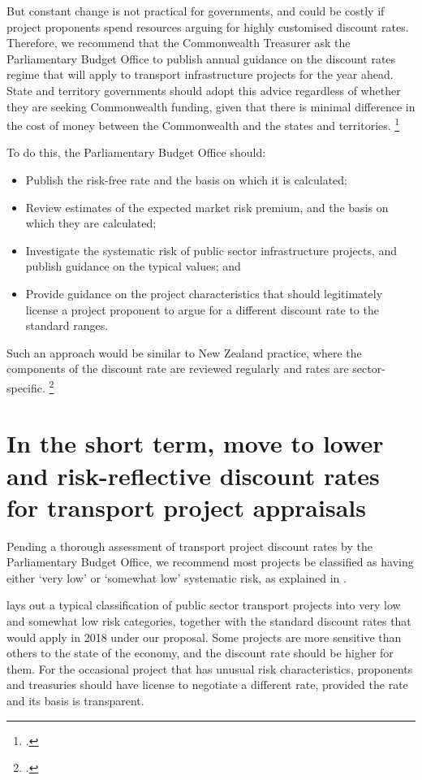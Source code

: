 \documentclass{grattan}
\begin{document}
But constant change is not practical for governments, and could be costly if project proponents spend resources arguing for highly customised discount rates. Therefore, we recommend that the Commonwealth Treasurer ask the Parliamentary Budget Office to publish annual guidance on the discount rates regime that will apply to transport infrastructure projects for the year ahead. State and territory governments should adopt this advice regardless of whether they are seeking Commonwealth funding, given that there is minimal difference in the cost of money between the Commonwealth and the states and territories.%
    \footcite[][21]{Terrill-Emslie-2017-What-price-value-capture}

To do this, the Parliamentary Budget Office should:
\begin{itemize}
\item Publish the risk-free rate and the basis on which it is calculated;
\item Review estimates of the expected market risk premium, and the basis on which they are calculated;
\item Investigate the systematic risk of public sector infrastructure projects, and publish guidance on the typical values; and
\item Provide guidance on the project characteristics that should legitimately license a project proponent to argue for a different discount rate to the standard ranges. 
\end{itemize}

Such an approach would be similar to New Zealand practice, where the components of the discount rate are reviewed regularly and rates are sector-specific.%
    \footcite{NZ-Treasury-2016-current-discount-rates}


\section{In the short term, move to lower and risk-reflective discount rates for transport project appraisals}\label{subsec:Two-standard-levels-of-project-risk}

Pending a thorough assessment of transport project discount rates by the Parliamentary Budget Office, we recommend most projects be classified as having either `very low' or `somewhat low' systematic risk, as explained in . 

 lays out a typical classification of public sector transport projects into very low and somewhat low risk categories, together with the standard discount rates that would apply in 2018 under our proposal. Some projects are more sensitive than others to the state of the economy, and the discount rate should be higher for them. For the occasional project that has unusual risk characteristics, proponents and treasuries should have license to negotiate a different rate, provided the rate and its basis is transparent.  
\end{document}
